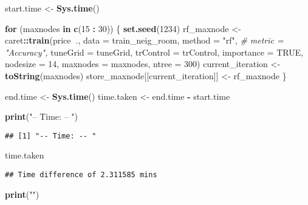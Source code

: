 \documentclass[
]{article}
\newenvironment{Shaded}{\begin{snugshade}}{\end{snugshade}}
\newcommand{\CommentTok}[1]{\textcolor[rgb]{0.56,0.35,0.01}{\textit{#1}}}
\newcommand{\ControlFlowTok}[1]{\textcolor[rgb]{0.13,0.29,0.53}{\textbf{#1}}}
\newcommand{\DataTypeTok}[1]{\textcolor[rgb]{0.13,0.29,0.53}{#1}}
\newcommand{\DecValTok}[1]{\textcolor[rgb]{0.00,0.00,0.81}{#1}}
\newcommand{\KeywordTok}[1]{\textcolor[rgb]{0.13,0.29,0.53}{\textbf{#1}}}
\newcommand{\NormalTok}[1]{#1}
\newcommand{\OperatorTok}[1]{\textcolor[rgb]{0.81,0.36,0.00}{\textbf{#1}}}
\newcommand{\OtherTok}[1]{\textcolor[rgb]{0.56,0.35,0.01}{#1}}
\newcommand{\StringTok}[1]{\textcolor[rgb]{0.31,0.60,0.02}{#1}}
\begin{document}
\begin{Shaded}
\begin{Highlighting}[]
\NormalTok{start.time <-}\StringTok{ }\KeywordTok{Sys.time}\NormalTok{()}

\ControlFlowTok{for}\NormalTok{ (maxnodes }\ControlFlowTok{in} \KeywordTok{c}\NormalTok{(}\DecValTok{15} \OperatorTok{:}\StringTok{ }\DecValTok{30}\NormalTok{)) \{}
  \KeywordTok{set.seed}\NormalTok{(}\DecValTok{1234}\NormalTok{)}
\NormalTok{  rf_maxnode <-}\StringTok{ }\NormalTok{caret}\OperatorTok{::}\KeywordTok{train}\NormalTok{(price}\OperatorTok{~}\NormalTok{.,}
                      \DataTypeTok{data =}\NormalTok{ train_neig_room,}
                      \DataTypeTok{method =} \StringTok{"rf"}\NormalTok{,}
                     \CommentTok{# metric = "Accuracy",}
                      \DataTypeTok{tuneGrid =}\NormalTok{ tuneGrid,}
                      \DataTypeTok{trControl =}\NormalTok{ trControl,}
                      \DataTypeTok{importance =} \OtherTok{TRUE}\NormalTok{,}
                      \DataTypeTok{nodesize =} \DecValTok{14}\NormalTok{,}
                      \DataTypeTok{maxnodes =}\NormalTok{ maxnodes,}
                      \DataTypeTok{ntree =} \DecValTok{300}\NormalTok{)}
\NormalTok{  current_iteration <-}\StringTok{ }\KeywordTok{toString}\NormalTok{(maxnodes)}
\NormalTok{  store_maxnode[[current_iteration]] <-}\StringTok{ }\NormalTok{rf_maxnode}
\NormalTok{\}}

\NormalTok{end.time <-}\StringTok{ }\KeywordTok{Sys.time}\NormalTok{()}
\NormalTok{time.taken <-}\StringTok{ }\NormalTok{end.time }\OperatorTok{-}\StringTok{ }\NormalTok{start.time}

\KeywordTok{print}\NormalTok{(}\StringTok{"-- Time: -- "}\NormalTok{)}
\end{Highlighting}
\end{Shaded}

\begin{verbatim}
## [1] "-- Time: -- "
\end{verbatim}

\begin{Shaded}
\begin{Highlighting}[]
\NormalTok{time.taken}
\end{Highlighting}
\end{Shaded}

\begin{verbatim}
## Time difference of 2.311585 mins
\end{verbatim}

\begin{Shaded}
\begin{Highlighting}[]
\KeywordTok{print}\NormalTok{(}\StringTok{""}\NormalTok{)}
\end{Highlighting}
\end{Shaded}
\end{document}
